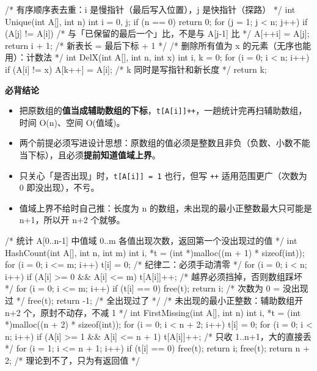 \documentclass[10pt,a4paper]{ctexart}
\begin{document}
\begin{codebox}
/* 有序顺序表去重：i 是慢指针（最后写入位置），j 是快指针（探路） */
int Unique(int A[], int n) {
    int i = 0, j;
    if (n == 0) return 0;
    for (j = 1; j < n; j++)
        if (A[j] != A[i])              /* 与「已保留的最后一个」比，不是与 A[j-1] 比 */
            A[++i] = A[j];
    return i + 1;                      /* 新表长 = 最后下标 + 1 */
}
/* 删除所有值为 x 的元素（无序也能用）：计数法 */
int DelX(int A[], int n, int x) {
    int i, k = 0;
    for (i = 0; i < n; i++)
        if (A[i] != x) A[k++] = A[i];  /* k 同时是写指针和新长度 */
    return k;
}
\end{codebox}




\textbf{必背结论}

\begin{itemize}

\item 把原数组的\textbf{值当成辅助数组的下标}，\texttt{t[A[i]]++}，一趟统计完再扫辅助数组，时间 O(n)、空间 O(值域)。

\item 两个前提必须写进设计思想：原数组的值必须是整数且非负（负数、小数不能当下标），且必须\textbf{提前知道值域上界}。

\item 只关心「是否出现」时，\texttt{t[A[i]] = 1} 也行，但写 \texttt{++} 适用范围更广（次数为 0 即没出现），不亏。

\item 值域上界不给时自己推：长度为 n 的数组，未出现的最小正整数最大只可能是 n+1，所以开 n+2 个就够。

\end{itemize}

\begin{codebox}
/* 统计 A[0..n-1] 中值域 0..m 各值出现次数，返回第一个没出现过的值 */
int HashCount(int A[], int n, int m) {
    int i, *t = (int *)malloc((m + 1) * sizeof(int));
    for (i = 0; i <= m; i++) t[i] = 0;          /* 纪律二：必须手动清零 */
    for (i = 0; i < n; i++)
        if (A[i] >= 0 && A[i] <= m) t[A[i]]++;  /* 越界必须挡掉，否则数组踩坏 */
    for (i = 0; i <= m; i++)
        if (t[i] == 0) { free(t); return i; }   /* 次数为 0 = 没出现过 */
    free(t);
    return -1;                                  /* 全出现过了 */
}
/* 未出现的最小正整数：辅助数组开 n+2 个，原封不动存，不减 1 */
int FirstMissing(int A[], int n) {
    int i, *t = (int *)malloc((n + 2) * sizeof(int));
    for (i = 0; i < n + 2; i++) t[i] = 0;
    for (i = 0; i < n; i++)
        if (A[i] >= 1 && A[i] <= n + 1) t[A[i]]++;   /* 只收 1..n+1，大的直接丢 */
    for (i = 1; i <= n + 1; i++)
        if (t[i] == 0) { free(t); return i; }
    free(t);
    return n + 2;                               /* 理论到不了，只为有返回值 */
}
\end{codebox}
\end{document}
